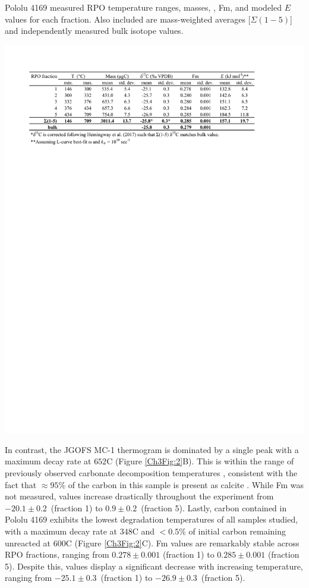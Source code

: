 \begin{table}
	\caption[Pololu 4169 RPO results]{Pololu 4169 measured RPO temperature ranges,  masses, , Fm, and modeled $E$ values for each fraction. Also included are mass-weighted averages [$\Sigma(1-5)$] and independently measured bulk isotope values.}
	\centering
		\includegraphics{Thesis_Tables/Ch3Tab4}
	\label{Ch3Tab:4} 
\end{table}

In contrast, the JGOFS MC-1 thermogram is dominated by a single peak with a maximum decay rate at $652$\textdegree C (Figure \ref{Ch3Fig:2}B). This is within the range of previously observed carbonate decomposition temperatures \citep{Plante:2013tu}, consistent with the fact that $\approx 95$\% of the carbon in this sample is present as calcite \citep{Sayles:2001ua}. While Fm was not measured,  values increase drastically throughout the experiment from $-20.1 \pm 0.2$\textperthousand\ (fraction 1) to $0.9 \pm 0.2$\textperthousand\ (fraction 5). Lastly, carbon contained in Pololu 4169 exhibits the lowest degradation temperatures of all samples studied, with a maximum decay rate at $348$\textdegree C and $<0.5$\% of initial carbon remaining unreacted at $600$\textdegree C (Figure \ref{Ch3Fig:2}C). Fm values are remarkably stable across RPO fractions, ranging from $0.278 \pm 0.001$ (fraction 1) to $0.285 \pm 0.001$ (fraction 5). Despite this,  values display a significant decrease with increasing temperature, ranging from $-25.1 \pm 0.3$\textperthousand\ (fraction 1) to $-26.9 \pm 0.3$\textperthousand\ (fraction 5). 

